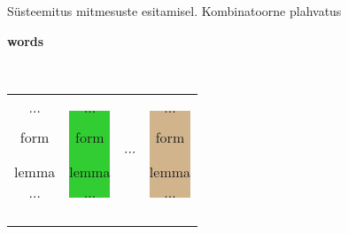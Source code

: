 \documentclass[landscape,footrule]{foils}
\begin{document}
\begin{triangles}
\item  Süsteemitus mitmesuste esitamisel. Kombinatoorne plahvatus \\
   
\hspace*{0.5cm}
\begin{minipage}{10cm} 
\begin{triangles}
\item \textbf{words} \vspace*{0.5ex} 
\begin{triangles}
\item {} \vspace*{1.5ex}\\
\begin{tabular}{cccc} 
\colorbox{Apricot}{
 \begin{minipage}{3.75cm}
 \begin{diamonds}
 \item $\ldots$
 \item form
 \item lemma
 \item $\ldots$\vspace*{1ex}
 \end{diamonds}
 \end{minipage}}
 &
 \colorbox{LimeGreen}{
 \begin{minipage}{3.75cm}
 \begin{diamonds}
 \item $\ldots$
 \item form
 \item lemma
 \item $\ldots$\vspace*{1ex}
 \end{diamonds} 
 \end{minipage}}
 & 
 $\cdots$
 &
 \colorbox{Tan}{
 \begin{minipage}{3.75cm}
 \begin{diamonds}
 \item $\ldots$
 \item form
 \item lemma
 \item $\ldots$\vspace*{1ex}
 \end{diamonds} 
 \end{minipage}}
 \\ \\
\colorbox{Apricot}{
 \begin{minipage}{3.75cm}

\end{minipage}}
\end{tabular}
\end{triangles}
\end{triangles}
\end{minipage}
\end{triangles}
\end{document}
